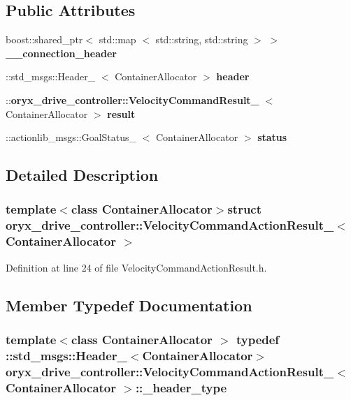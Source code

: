 \subsection*{\-Public \-Attributes}
\begin{DoxyCompactItemize}
\item 
boost\-::shared\-\_\-ptr$<$ std\-::map\*
$<$ std\-::string, std\-::string $>$ $>$ {\bf \-\_\-\-\_\-connection\-\_\-header}
\item 
\-::std\-\_\-msgs\-::\-Header\-\_\-\*
$<$ \-Container\-Allocator $>$ {\bf header}
\item 
\-::{\bf oryx\-\_\-drive\-\_\-controller\-::\-Velocity\-Command\-Result\-\_\-}\*
$<$ \-Container\-Allocator $>$ {\bf result}
\item 
\-::actionlib\-\_\-msgs\-::\-Goal\-Status\-\_\-\*
$<$ \-Container\-Allocator $>$ {\bf status}
\end{DoxyCompactItemize}


\subsection{\-Detailed \-Description}
\subsubsection*{template$<$class Container\-Allocator$>$struct oryx\-\_\-drive\-\_\-controller\-::\-Velocity\-Command\-Action\-Result\-\_\-$<$ Container\-Allocator $>$}



\-Definition at line 24 of file \-Velocity\-Command\-Action\-Result.\-h.



\subsection{\-Member \-Typedef \-Documentation}
\subsubsection[{\-\_\-header\-\_\-type}]{\setlength{\rightskip}{0pt plus 5cm}template$<$class Container\-Allocator $>$ typedef \-::std\-\_\-msgs\-::\-Header\-\_\-$<$\-Container\-Allocator$>$ {\bf oryx\-\_\-drive\-\_\-controller\-::\-Velocity\-Command\-Action\-Result\-\_\-}$<$ \-Container\-Allocator $>$\-::{\bf \-\_\-header\-\_\-type}}\label{structoryx__drive__controller_1_1VelocityCommandActionResult___af0b93d800bfc1de3196cf03593ad5e6b}


